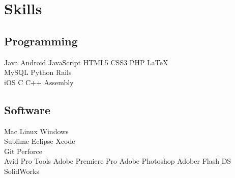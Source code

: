 \documentclass[letterpaper]{deedy-resume} %
\begin{document}
\begin{minipage}[t]{0.33\textwidth}
\sectionspace %


\section{Skills}

\subsection{Programming}

Java \textbullet{}
Android \textbullet{}
JavaScript \textbullet{}
HTML5 \textbullet{}
CSS3 \textbullet{}
PHP \textbullet{}
\LaTeX\ \\
MySQL \textbullet{}
Python \textbullet{}
Rails \\
iOS \textbullet{}
C \textbullet{}
C++ \textbullet{}
Assembly \\

\sectionspace %

\subsection{Software}
Mac \textbullet{}
Linux \textbullet{}
Windows \\
Sublime \textbullet{}
Eclipse \textbullet{}
Xcode \\
Git \textbullet{}
Perforce \\
Avid Pro Tools \textbullet{}
Adobe Premiere Pro \textbullet{}
Adobe Photoshop \textbullet{}
Adober Flash \textbullet{}
DS SolidWorks \\



\sectionspace %


\end{minipage} %
\hfill
%
\end{document}
